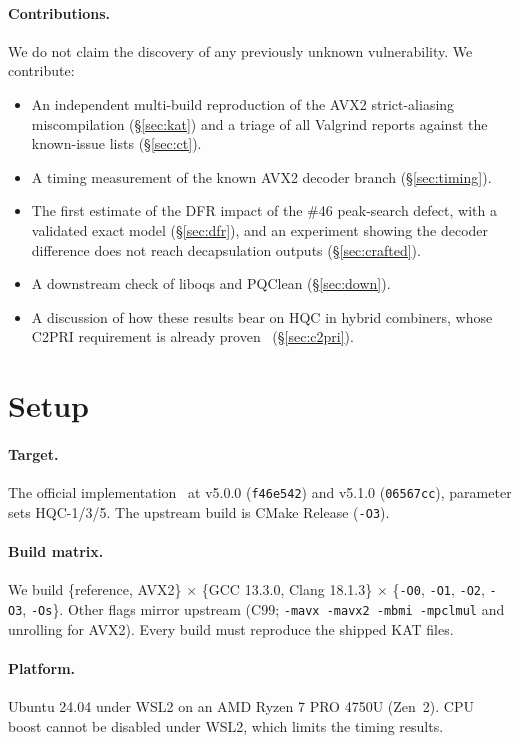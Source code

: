 \documentclass[11pt,a4paper]{article}
\begin{document}
\paragraph{Contributions.} We do not claim the discovery of any previously unknown vulnerability. We contribute:
\begin{itemize}
\item An independent multi-build reproduction of the AVX2 strict-aliasing miscompilation (\S\ref{sec:kat}) and a triage of all Valgrind reports against the known-issue lists (\S\ref{sec:ct}).
\item A timing measurement of the known AVX2 decoder branch (\S\ref{sec:timing}).
\item The first estimate of the DFR impact of the \#46 peak-search defect, with a validated exact model (\S\ref{sec:dfr}), and an experiment showing the decoder difference does not reach decapsulation outputs (\S\ref{sec:crafted}).
\item A downstream check of liboqs and PQClean (\S\ref{sec:down}).
\item A discussion of how these results bear on HQC in hybrid combiners, whose C2PRI requirement is already proven~\cite{Starfighters} (\S\ref{sec:c2pri}).
\end{itemize}

\section{Setup}
\paragraph{Target.} The official implementation~\cite{HQCrepo} at v5.0.0 (\texttt{f46e542}) and v5.1.0 (\texttt{06567cc}), parameter sets HQC-1/3/5. The upstream build is CMake Release (\texttt{-O3}).

\paragraph{Build matrix.} We build \{reference, AVX2\} $\times$ \{GCC 13.3.0, Clang 18.1.3\} $\times$ \{\texttt{-O0}, \texttt{-O1}, \texttt{-O2}, \texttt{-O3}, \texttt{-Os}\}. Other flags mirror upstream (C99; \texttt{-mavx -mavx2 -mbmi -mpclmul} and unrolling for AVX2). Every build must reproduce the shipped KAT files.

\paragraph{Platform.} Ubuntu 24.04 under WSL2 on an AMD Ryzen 7 PRO 4750U (Zen~2). CPU boost cannot be disabled under WSL2, which limits the timing results.
\end{document}
